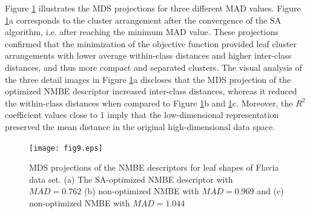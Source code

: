 {Figure \ref{MDS:Leaves} illustrates the MDS projections for three different MAD values. Figure \ref{MDS:Leaves}a corresponds to the cluster arrangement after the convergence of the SA algorithm, i.e. after reaching the minimum MAD value. These projections confirmed that the minimization of the objective function provided leaf cluster arrangements with lower average within-class distances and higher inter-class distances, and thus  more compact and separated clusters. The visual analysis of the three detail images in Figure \ref{MDS:Leaves}a discloses that the MDS projection of the optimized NMBE descriptor increased inter-class distances, whereas it reduced the within-class distances when compared to Figure \ref{MDS:Leaves}b and \ref{MDS:Leaves}c. Moreover, the $R^2$ coefficient values close to 1 imply that the low-dimensional representation preserved the mean distance in the original high-dimensional data space.

\begin{figure}[h!]
\centering
\texttt{[image: fig9.eps]}
 \caption{\label{MDS:Leaves} MDS projections of the NMBE descriptors for leaf shapes of Flavia data set. (a) The SA-optimized NMBE descriptor with $MAD = 0.762$ (b) non-optimized NMBE with $MAD =0.969$ and (c) non-optimized NMBE with $MAD = 1.044$ }
\end{figure}
}
